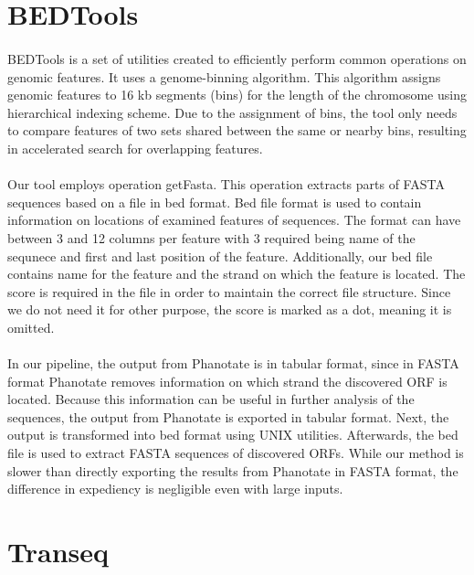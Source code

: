 \section{BEDTools}
\paragraph*{}
BEDTools\cite{quinlan2010bedtools} is a set of utilities created to efficiently perform common operations on genomic features. It uses a genome-binning algorithm. This algorithm assigns genomic features to 16 kb segments (bins) for the length of the chromosome using hierarchical indexing scheme. Due to the assignment of bins, the tool only needs to compare features of two sets shared between the same or nearby bins, resulting in accelerated search for overlapping features.
\paragraph*{}
Our tool employs operation getFasta. This operation extracts parts of FASTA sequences based on a file in bed format. Bed file format is used to contain information on locations of examined features of sequences. The format can have between 3 and 12 columns per feature with 3 required being name of the sequnece and first and last position of the feature. Additionally, our bed file contains name for the feature and the strand on which the feature is located. The score is required in the file in order to maintain the correct file structure. Since we do not need it for other purpose, the score is marked as a dot, meaning it is omitted.
\paragraph*{}
In our pipeline, the output from Phanotate is in tabular format, since in FASTA format Phanotate removes information on which strand the discovered ORF is located. Because this information can be useful in further analysis of the sequences, the output from Phanotate is exported in tabular format. Next, the output is transformed into bed format using UNIX utilities. Afterwards, the bed file is used to extract FASTA sequences of discovered ORFs. While our method is slower than directly exporting the results from Phanotate in FASTA format, the difference in expediency is negligible even with large inputs.

\section{Transeq}

